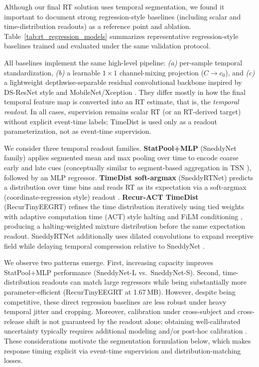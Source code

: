 \documentclass[12pt]{article}
\begin{document}
Although our final RT solution uses temporal segmentation, we found it important to document strong regression-style
baselines (including scalar and time-distribution readouts) as a reference point and ablation.
Table~\ref{tab:rt_regression_models} summarizes representative regression-style baselines trained and evaluated under the
same validation protocol.

All baselines implement the same high-level pipeline: \emph{(a)} per-sample temporal standardization,
\emph{(b)} a learnable $1{\times}1$ channel-mixing projection ($C \!\rightarrow\! c_0$), and \emph{(c)} a lightweight
depthwise-separable residual convolutional backbone inspired by DS-ResNet style and MobileNet/Xception
\citep{howard2017mobilenets,chollet2017xception}. They differ mostly in how the final temporal feature map is converted into an RT estimate, that is, the \emph{temporal readout}.
In all cases, supervision remains scalar RT (or an RT-derived target) without explicit event-time labels; TimeDist is used only as a readout parameterization, not as event-time supervision.

We consider three temporal readout families. \textbf{StatPool+MLP} (SneddyNet family) applies segmented mean and max
pooling over time to encode coarse early and late cues (conceptually similar to segment-based aggregation in TSN
\citep{wang2016tsn}), followed by an MLP regressor. \textbf{TimeDist soft-argmax} (SneddyRTNet) predicts a distribution
over time bins and reads RT as its expectation via a soft-argmax (coordinate-regression style) readout
\citep{nibali2018dsnt}. \textbf{Recur-ACT TimeDist} (RecurTinyEEGRT) refines the time distribution iteratively using tied
weights with adaptive computation time (ACT) style halting \citep{graves2016act} and FiLM conditioning \citep{perez2018film},
producing a halting-weighted mixture distribution before the same expectation readout. 
SneddyRTNet additionally uses dilated convolutions to expand receptive field while delaying temporal compression relative to SneddyNet \citep{yu2016dilated}.

We observe two patterns emerge. First, increasing capacity improves StatPool+MLP performance
(SneddyNet-L vs.\ SneddyNet-S). Second, time-distribution readouts can match large regressors while being substantially
more parameter-efficient (RecurTinyEEGRT at 1.67\,MB). However, despite being competitive, these direct regression
baselines are less robust under heavy temporal jitter and cropping. Moreover, calibration under cross-subject and cross-release shift is not guaranteed by the readout alone; obtaining well-calibrated uncertainty typically requires additional
modeling and/or post-hoc calibration \citep{guo2017calibration,kendall2017uncertainties}. These considerations motivate the
segmentation formulation below, which makes response timing explicit via event-time supervision and
distribution-matching losses.
\end{document}
